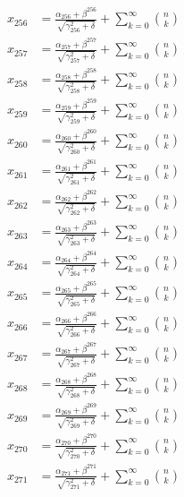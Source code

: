 \documentclass{article}
\begin{document}
\begin{align}
  x_{256} &= \frac{\alpha_{256} + \beta^{256}}{\sqrt{\gamma_{256}^2 + \delta}} + \sum_{k=0}^{\infty} \binom{n}{k} \label{eq:256} \\
  x_{257} &= \frac{\alpha_{257} + \beta^{257}}{\sqrt{\gamma_{257}^2 + \delta}} + \sum_{k=0}^{\infty} \binom{n}{k} \label{eq:257} \\
  x_{258} &= \frac{\alpha_{258} + \beta^{258}}{\sqrt{\gamma_{258}^2 + \delta}} + \sum_{k=0}^{\infty} \binom{n}{k} \label{eq:258} \\
  x_{259} &= \frac{\alpha_{259} + \beta^{259}}{\sqrt{\gamma_{259}^2 + \delta}} + \sum_{k=0}^{\infty} \binom{n}{k} \label{eq:259} \\
  x_{260} &= \frac{\alpha_{260} + \beta^{260}}{\sqrt{\gamma_{260}^2 + \delta}} + \sum_{k=0}^{\infty} \binom{n}{k} \label{eq:260} \\
  x_{261} &= \frac{\alpha_{261} + \beta^{261}}{\sqrt{\gamma_{261}^2 + \delta}} + \sum_{k=0}^{\infty} \binom{n}{k} \label{eq:261} \\
  x_{262} &= \frac{\alpha_{262} + \beta^{262}}{\sqrt{\gamma_{262}^2 + \delta}} + \sum_{k=0}^{\infty} \binom{n}{k} \label{eq:262} \\
  x_{263} &= \frac{\alpha_{263} + \beta^{263}}{\sqrt{\gamma_{263}^2 + \delta}} + \sum_{k=0}^{\infty} \binom{n}{k} \label{eq:263} \\
  x_{264} &= \frac{\alpha_{264} + \beta^{264}}{\sqrt{\gamma_{264}^2 + \delta}} + \sum_{k=0}^{\infty} \binom{n}{k} \label{eq:264} \\
  x_{265} &= \frac{\alpha_{265} + \beta^{265}}{\sqrt{\gamma_{265}^2 + \delta}} + \sum_{k=0}^{\infty} \binom{n}{k} \label{eq:265} \\
  x_{266} &= \frac{\alpha_{266} + \beta^{266}}{\sqrt{\gamma_{266}^2 + \delta}} + \sum_{k=0}^{\infty} \binom{n}{k} \label{eq:266} \\
  x_{267} &= \frac{\alpha_{267} + \beta^{267}}{\sqrt{\gamma_{267}^2 + \delta}} + \sum_{k=0}^{\infty} \binom{n}{k} \label{eq:267} \\
  x_{268} &= \frac{\alpha_{268} + \beta^{268}}{\sqrt{\gamma_{268}^2 + \delta}} + \sum_{k=0}^{\infty} \binom{n}{k} \label{eq:268} \\
  x_{269} &= \frac{\alpha_{269} + \beta^{269}}{\sqrt{\gamma_{269}^2 + \delta}} + \sum_{k=0}^{\infty} \binom{n}{k} \label{eq:269} \\
  x_{270} &= \frac{\alpha_{270} + \beta^{270}}{\sqrt{\gamma_{270}^2 + \delta}} + \sum_{k=0}^{\infty} \binom{n}{k} \label{eq:270} \\
  x_{271} &= \frac{\alpha_{271} + \beta^{271}}{\sqrt{\gamma_{271}^2 + \delta}} + \sum_{k=0}^{\infty} \binom{n}{k} \label{eq:271} \\

\end{align}
\end{document}
